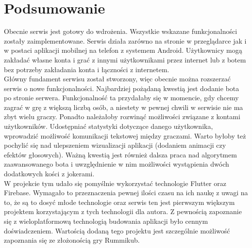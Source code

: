 \chapter*{Podsumowanie}
\thispagestyle{chapterBeginStyle}

Obecnie serwis jest gotowy do wdrożenia. Wszystkie wskazane funkcjonalności zostały zaimplementowane. Serwis działa zarówno na stronie w przeglądarce jak i w postaci aplikacji mobilnej na telefon z systemem Android. Użytkownicy mogą zakładać własne konta i grać z innymi użytkownikami przez internet lub z botem bez potrzeby zakładania konta i łączności z internetem. \\

Główny fundament serwisu został stworzony, więc obecnie można rozszerzać serwis o nowe funkcjonalności. Najbardziej pożądaną kwestią jest dodanie bota po stronie serwera. Funkcjonalność ta przydałaby się w momencie, gdy chcemy zagrać w grę z większą liczbą osób, a niestety w pewnej chwili w serwisie nie ma zbyt wielu graczy. Ponadto należałoby rozwinąć możliwości związane z kontami użytkowników. Udostępniać statystyki dotyczące danego użytkownika, wprowadzić możliwość komunikacji tekstowej między graczami. Warto byłoby też pochylić się nad ulepszeniem wizualizacji aplikacji (dodaniem animacji czy efektów głosowych). Ważną kwestią jest również dalsza praca nad algorytmem zaawansowanego bota i uwzględnienie w nim możliwości wystąpienia dwóch dodatkowych kości z jokerami. \\

W projekcie tym udało się pomyślnie wykorzystać technologie Flutter oraz Firebase. Wymagało to przeznaczenia pewnej ilości czasu na ich naukę z uwagi na to, że są to dosyć młode technologie oraz serwis ten jest pierwszym większym projektem korzystającym z tych technologii dla autora. Z pewnością zapoznanie się z wieloplatformową technologią budowania aplikacji było cennym doświadczeniem. Wartością dodaną tego projektu jest szczególnie możliwość zapoznania się ze złożonością gry Rummikub.